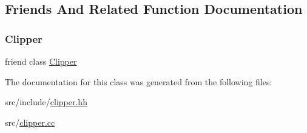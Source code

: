 \subsection{Friends And Related Function Documentation}
\mbox{\label{class_clipper_lib_1_1_poly_tree_a4d39a09ecdddeeb85930dd4554a54b3c}} 
\subsubsection{\texorpdfstring{Clipper}{Clipper}}
{\footnotesize\ttfamily friend class \mbox{\hyperlink{class_clipper_lib_1_1_clipper}{Clipper}}\hspace{0.3cm}{\ttfamily [friend]}}



The documentation for this class was generated from the following files\+:\begin{DoxyCompactItemize}
\item 
src/include/\mbox{\hyperlink{clipper_8hh}{clipper.\+hh}}\item 
src/\mbox{\hyperlink{clipper_8cc}{clipper.\+cc}}\end{DoxyCompactItemize}
